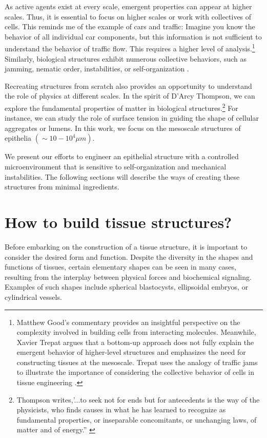 As active agents exist at every scale, emergent properties can appear at higher scales. Thus, it is essential to focus on higher scales or work with collectives of cells. This reminds me of the example of cars and traffic: Imagine you know the behavior of all individual car components, but this information is not sufficient to understand the behavior of traffic flow. This requires a higher level of analysis.\footnote{Matthew Good's commentary provides an insightful perspective on the complexity involved in building cells from interacting molecules. Meanwhile, Xavier Trepat argues that a bottom-up approach does not fully explain the emergent behavior of higher-level structures and emphasizes the need for constructing tissues at the mesoscale. Trepat uses the analogy of traffic jams to illustrate the importance of considering the collective behavior of cells in tissue engineering \cite{good2018}.} 
Similarly, biological structures exhibit numerous collective behaviors, such as jamming, nematic order, instabilities, or self-organization \cite{trepat2018}. 

Recreating structures from scratch also provides an opportunity to understand the role of physics at different scales. In the spirit of D'Arcy Thompson, we can explore the fundamental properties of matter in biological structures.\footnote{Thompson writes,’...to seek not for ends but for antecedents is the way of the physicists, who finds causes in what he has learned to recognize as fundamental properties, or inseparable concomitants, or unchanging laws, of matter and of energy.” \cite{thompson1979}}
For instance, we can study the role of surface tension in guiding the shape of cellular aggregates or lumens. In this work, we focus on the mesoscale structures of epithelia \((\sim 10-10^4 \mu m)\).  

We present our efforts to engineer an epithelial structure with a controlled microenvironment that is sensitive to self-organization and mechanical instabilities. The following sections will describe the ways of creating these structures from minimal ingredients.

\hypertarget{how-to-build-tissue-structures}{%
	\section{How to build tissue 		structures?}\label{how-to-build-tissue-structures}}

Before embarking on the construction of a tissue structure, it is important to consider the desired form and function. Despite the diversity in the shapes and functions of tissues, certain elementary shapes can be seen in many cases, resulting from the interplay between physical forces and biochemical signaling. Examples of such shapes include spherical blastocysts, ellipsoidal embryos, or cylindrical vessels.

